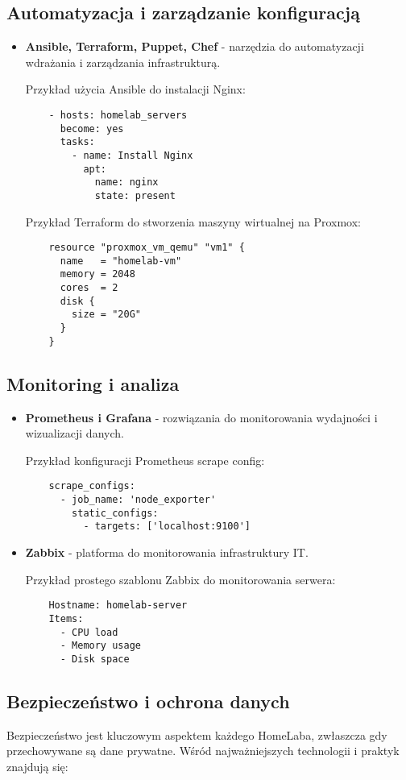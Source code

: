 \subsection{Automatyzacja i zarządzanie konfiguracją}
\begin{itemize}
    \item \textbf{Ansible, Terraform, Puppet, Chef} - narzędzia do automatyzacji wdrażania i zarządzania infrastrukturą.

    Przykład użycia Ansible do instalacji Nginx:
    \begin{lstlisting}
    - hosts: homelab_servers
      become: yes
      tasks:
        - name: Install Nginx
          apt:
            name: nginx
            state: present
    \end{lstlisting}

    Przykład Terraform do stworzenia maszyny wirtualnej na Proxmox:
    \begin{lstlisting}
    resource "proxmox_vm_qemu" "vm1" {
      name   = "homelab-vm"
      memory = 2048
      cores  = 2
      disk {
        size = "20G"
      }
    }
    \end{lstlisting}
\end{itemize}

\subsection{Monitoring i analiza}
\begin{itemize}
    \item \textbf{Prometheus i Grafana} - rozwiązania do monitorowania wydajności i wizualizacji danych.
    
    Przykład konfiguracji Prometheus scrape config:
    \begin{lstlisting}
    scrape_configs:
      - job_name: 'node_exporter'
        static_configs:
          - targets: ['localhost:9100']
    \end{lstlisting}
    
    \item \textbf{Zabbix} - platforma do monitorowania infrastruktury IT.
    
    Przykład prostego szablonu Zabbix do monitorowania serwera:
    \begin{lstlisting}
    Hostname: homelab-server
    Items:
      - CPU load
      - Memory usage
      - Disk space
    \end{lstlisting}
\end{itemize}

\subsection{Bezpieczeństwo i ochrona danych}
Bezpieczeństwo jest kluczowym aspektem każdego HomeLaba, zwłaszcza gdy przechowywane są dane prywatne. Wśród najważniejszych technologii i praktyk znajdują się:

